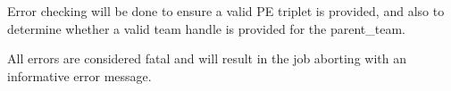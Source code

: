 \begin{apidefinition}
{Error checking will be done to ensure a valid \ac{PE} triplet is provided,
and also to determine whether a valid team handle is provided for the
parent\_team.

All errors are considered fatal and will result in the job aborting with
an informative error message.
}



\begin{apiexamples}

\end{apiexamples}

\end{apidefinition}
